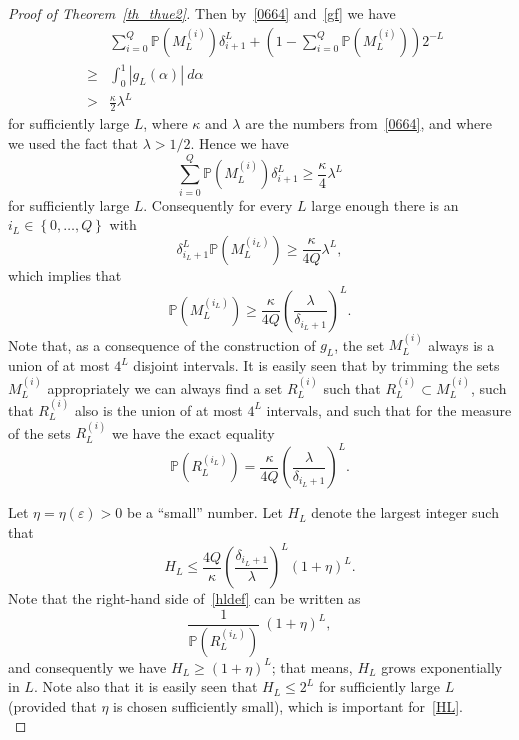 \documentclass[12pt]{amsart}
\newcommand {\ve} {\varepsilon}
\begin{document}
\begin{proof}[Proof of Theorem~\ref{th_thue2}]
Then by~\eqref{0664} and~\eqref{gf} we have
\begin{eqnarray*}
& & \sum^{Q}_{i=0} \mathbb{P} \left(M^{\left(i\right)}_{L}\right) \delta^{L}_{i+1} + \left(1-\sum^{Q}_{i=0} \mathbb{P} \left(M^{\left(i\right)}_{L}\right)\right) 2^{-L}\\
& \geq & \int^{1}_{0} |g_{L}\left(\alpha \right)| ~d\alpha  \\
& > & \frac{\kappa}{2} \lambda^{L}
\end{eqnarray*}
for sufficiently large $L$, where $\kappa$ and $\lambda$ are the numbers from~\eqref{0664}, and where we used the fact that $\lambda > 1/2$. Hence we have
$$
\sum^{Q}_{i=0} \mathbb{P} \left(M^{\left(i\right)}_{L}\right) \delta^{L}_{i+1} \geq \frac{\kappa}{4} \lambda^{L}
$$
for sufficiently large $L$. Consequently for every $L$ large enough there is an $i_{L} \in \left\{0, \ldots, Q\right\}$ with
$$
\delta_{i_{L}+1}^L \mathbb{P} \left(M^{\left(i_{L}\right)}_{L}\right) \geq \frac{\kappa}{4 Q} \lambda^{L},
$$
which implies that
$$
\mathbb{P}\left(M^{\left(i_{L}\right)}_{L}\right) \geq \frac{\kappa}{4 Q} \left(\frac{\lambda}{\delta_{i_{L}+1}}\right)^{L}.
$$
Note that, as a consequence of the construction of $g_L$, the set $M^{\left(i\right)}_{L}$ always is a union of at most $4^L$ disjoint intervals. It is easily seen that by trimming the sets $M^{\left(i\right)}_{L}$ appropriately we can always find a set $R^{\left(i\right)}_{L}$ such that $R^{\left(i\right)}_{L} \subset M^{\left(i\right)}_{L}$, such that $R^{\left(i\right)}_{L}$ also is the union of at most $4^L$ intervals, and such that for the measure of the sets $R^{\left(i\right)}_{L}$ we have the exact equality
$$
\mathbb{P} \left(R_{L}^{(i_{L})}\right) = \frac{\kappa}{4 Q} \left(\frac{\lambda}{\delta_{i_{L}+1}}\right)^{L}.
$$

Let $\eta=\eta(\ve)>0$ be a ``small'' number. Let $H_L$ denote the largest integer such that
\begin{equation} \label{hldef}
H_L \leq \frac{4 Q}{\kappa} \left(\frac{\delta_{i_L+1}}{\lambda}\right)^{L} (1+\eta)^L.
\end{equation}
Note that the right-hand side of~\eqref{hldef} can be written as
$$
\frac{1}{\mathbb{P} \left(R_{L}^{(i_{L})}\right)}~  (1+\eta)^L,
$$
and consequently we have $H_L \geq (1+\eta)^L$; that means, $H_L$ grows exponentially in $L$. Note also that it is easily seen that $H_L\leq 2^L$ for sufficiently large $L$ (provided that $\eta$ is chosen sufficiently small), which is important for~\eqref{HL}.\\


\end{proof}
\end{document}
